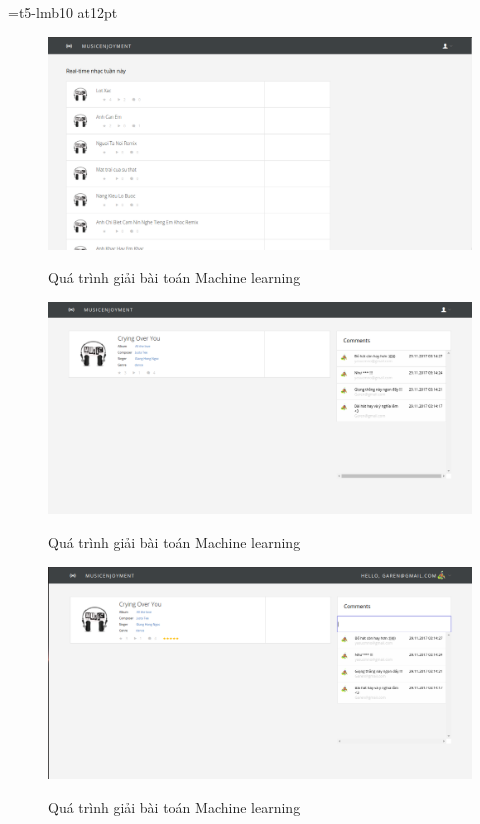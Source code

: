 \documentclass[12pt,a4paper,oneside,openright]{article}
\numberwithin{subsection}{section}
\theoremstyle{definition}
\theoremstyle{plain}
\theoremstyle{definition}
\theoremstyle{definition}
\theoremstyle{remark}
\theoremstyle{definition}
\begin{document}
\font\chuong=t5-lmb10 at12pt%
 \def\chaptername{\chuong CHƯƠNG}
\fontsize{14pt}{14pt}\selectfont%

\newcommand{\set}[1]{\mathbb{#1}}
\providecommand{\keywords}[1]{\textbf{\textit{Từ khóa---}} #1}


\begin{figure}[h!]
  \caption{Quá trình giải bài toán Machine learning}
  \includegraphics[width=\textwidth]{bxh.png}
  \label{bxh}
\end{figure}


\begin{figure}[h!]
  \caption{Quá trình giải bài toán Machine learning}
  \includegraphics[width=\textwidth]{nhac.png}
  \label{nhac}
\end{figure}


\begin{figure}[h!]
  \caption{Quá trình giải bài toán Machine learning}
  \includegraphics[width=\textwidth]{nhac-login.png}
  \label{fg:nhac-login}
\end{figure}
\end{document}
